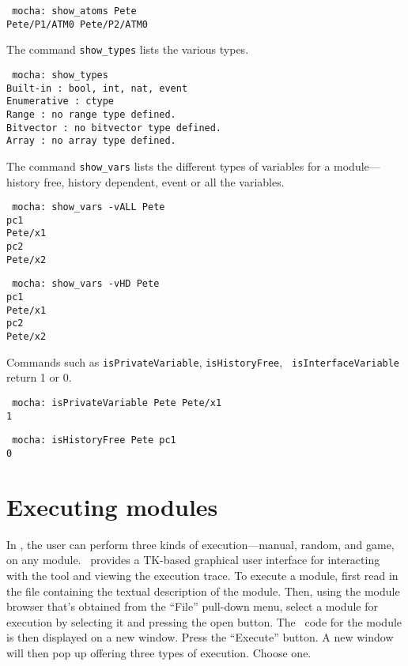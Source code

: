 \mypar
{\tt
mocha: show\_atoms Pete \\
Pete/P1/ATM0 Pete/P2/ATM0 \\
}

\mypar
The command {\tt show\_types} lists the various types.

\mypar
{\tt
mocha: show\_types \\
Built-in    : bool, int, nat, event \\
Enumerative : ctype \\
Range       : no range type defined. \\
Bitvector   : no bitvector type defined. \\
Array       : no array type defined. \\
}

\mypar
The command {\tt show\_vars} lists the different types of variables for
a module---history free, history dependent, event or all the variables.

\mypar
{\tt
mocha: show\_vars -vALL Pete \\
pc1 \\
Pete/x1 \\
pc2 \\
Pete/x2 \\
}

\mypar
{\tt 
mocha: show\_vars -vHD Pete \\
pc1 \\
Pete/x1 \\
pc2 \\ 
Pete/x2 \\
}

\mypar
Commands such as {\tt isPrivateVariable}, {\tt isHistoryFree}, {\tt
isInterfaceVariable} return 1 or 0. 

\mypar
{\tt
mocha: isPrivateVariable Pete Pete/x1 \\
1
}

\mypar
{\tt
mocha: isHistoryFree Pete pc1 \\
0 \\
}

\section{Executing modules}
\label{subsec:execution}

In \mocha, the user can perform three kinds of execution---manual,
random, and game, on any module. \mocha\ provides a TK-based graphical
user interface for interacting with the tool and viewing the
execution trace. To execute a module, first read in the
file containing the textual description of the module. Then, using
the module browser that's obtained from the ``File'' pull-down menu,
select a module for execution by selecting it and pressing the open
button. The \rem\ code for the module is then displayed on a new
window. Press the ``Execute'' button. 
A new window will then pop up offering three types of
execution. Choose one. 

